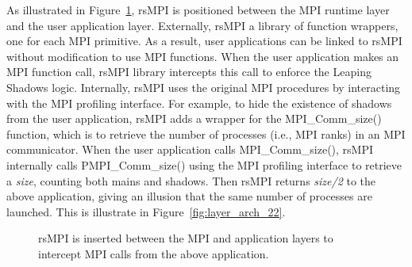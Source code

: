 As illustrated in Figure~\ref{fig:layer_arch}, rsMPI is positioned between the MPI runtime layer and the user application layer. Externally, rsMPI a library of function wrappers, one for each MPI primitive. As a result, user applications can be linked to rsMPI without modification to use MPI functions. When the user application makes an MPI function call, rsMPI library intercepts this call to enforce the Leaping Shadows logic. Internally, rsMPI uses the original MPI procedures by interacting with the MPI profiling interface. For example, to hide the existence of shadows from the user application, rsMPI adds a wrapper for the MPI\_Comm\_size() function, which is to retrieve the number of processes (i.e., MPI ranks) in an MPI communicator. When the user application calls MPI\_Comm\_size(), rsMPI internally calls PMPI\_Comm\_size() using the MPI profiling interface to retrieve a \textit{size}, counting both mains and shadows. Then rsMPI returns \textit{size/2} to the above application, giving an illusion that the same number of processes are launched. This is illustrate in Figure~\ref{fig:layer_arch_22}.


\begin{figure}[!h]
  \begin{center}
  \end{center}
  \caption{rsMPI is inserted between the MPI and application layers to intercept MPI calls from the above application.}
  \label{fig:layer_arch}
\end{figure}

